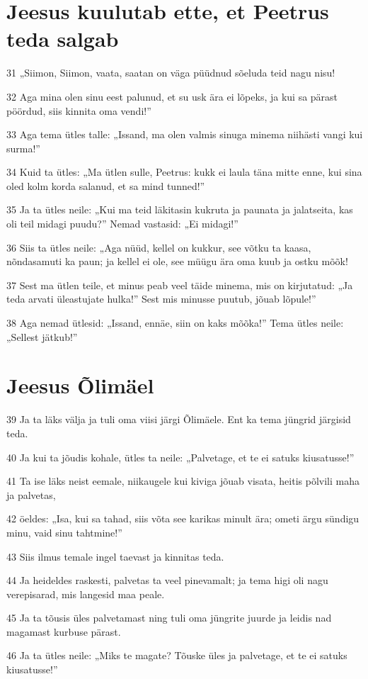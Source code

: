 \section*{Jeesus kuulutab ette, et Peetrus teda salgab}

\par 31 „Siimon, Siimon, vaata, saatan on väga püüdnud sõeluda teid nagu nisu!
\par 32 Aga mina olen sinu eest palunud, et su usk ära ei lõpeks, ja kui sa pärast pöördud, siis kinnita oma vendi!”
\par 33 Aga tema ütles talle: „Issand, ma olen valmis sinuga minema niihästi vangi kui surma!”
\par 34 Kuid ta ütles: „Ma ütlen sulle, Peetrus: kukk ei laula täna mitte enne, kui sina oled kolm korda salanud, et sa mind tunned!”
\par 35 Ja ta ütles neile: „Kui ma teid läkitasin kukruta ja paunata ja jalatseita, kas oli teil midagi puudu?” Nemad vastasid: „Ei midagi!”
\par 36 Siis ta ütles neile: „Aga nüüd, kellel on kukkur, see võtku ta kaasa, nõndasamuti ka paun; ja kellel ei ole, see müügu ära oma kuub ja ostku mõõk!
\par 37 Sest ma ütlen teile, et minus peab veel täide minema, mis on kirjutatud: „Ja teda arvati üleastujate hulka!” Sest mis minusse puutub, jõuab lõpule!”
\par 38 Aga nemad ütlesid: „Issand, ennäe, siin on kaks mõõka!” Tema ütles neile: „Sellest jätkub!”

\section*{Jeesus Õlimäel}

\par 39 Ja ta läks välja ja tuli oma viisi järgi Õlimäele. Ent ka tema jüngrid järgisid teda.
\par 40 Ja kui ta jõudis kohale, ütles ta neile: „Palvetage, et te ei satuks kiusatusse!”
\par 41 Ta ise läks neist eemale, niikaugele kui kiviga jõuab visata, heitis põlvili maha ja palvetas,
\par 42 öeldes: „Isa, kui sa tahad, siis võta see karikas minult ära; ometi ärgu sündigu minu, vaid sinu tahtmine!”
\par 43 Siis ilmus temale ingel taevast ja kinnitas teda.
\par 44 Ja heideldes raskesti, palvetas ta veel pinevamalt; ja tema higi oli nagu verepisarad, mis langesid maa peale.
\par 45 Ja ta tõusis üles palvetamast ning tuli oma jüngrite juurde ja leidis nad magamast kurbuse pärast.
\par 46 Ja ta ütles neile: „Miks te magate? Tõuske üles ja palvetage, et te ei satuks kiusatusse!”

